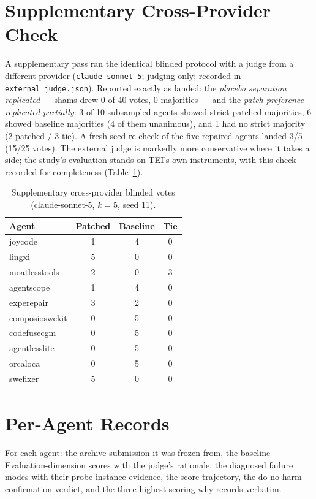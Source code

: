 \section{Supplementary Cross-Provider Check}
\label{app:ext}
A supplementary pass ran the identical blinded protocol with a judge from a
different provider (\texttt{claude-sonnet-5}; judging only; recorded in
\texttt{external\_judge.json}). Reported exactly as landed: the \emph{placebo
separation replicated} --- shams drew 0 of 40 votes, 0 majorities --- and the
\emph{patch preference replicated partially}: 3 of 10 subsampled agents showed
strict patched majorities, 6 showed baseline majorities (4 of them unanimous),
and 1 had no strict majority (2 patched / 3 tie). A fresh-seed re-check of the
five repaired agents landed 3/5 (15/25 votes). The external judge is markedly
more conservative where it takes a side; the study's evaluation stands on
TEI's own instruments, with this check recorded for completeness
(Table~\ref{tab:ext}).

\begin{table}[h]\centering
\caption{Supplementary cross-provider blinded votes (claude-sonnet-5, $k{=}5$, seed 11).}
\label{tab:ext}\footnotesize
\begin{tabular}{lccc}\toprule Agent & Patched & Baseline & Tie \\ \midrule
joycode & 1 & 4 & 0 \\
lingxi & 5 & 0 & 0 \\
moatlesstools & 2 & 0 & 3 \\
agentscope & 1 & 4 & 0 \\
experepair & 3 & 2 & 0 \\
composioswekit & 0 & 5 & 0 \\
codefusecgm & 0 & 5 & 0 \\
agentlesslite & 0 & 5 & 0 \\
orcaloca & 0 & 5 & 0 \\
swefixer & 5 & 0 & 0 \\
\bottomrule\end{tabular}\end{table}

\clearpage
\section{Per-Agent Records}
\label{app:agents}
For each agent: the archive submission it was frozen from, the baseline
Evaluation-dimension scores with the judge's rationale, the diagnosed failure
modes with their probe-instance evidence, the score trajectory, the do-no-harm
confirmation verdict, and the three highest-scoring why-records verbatim.

